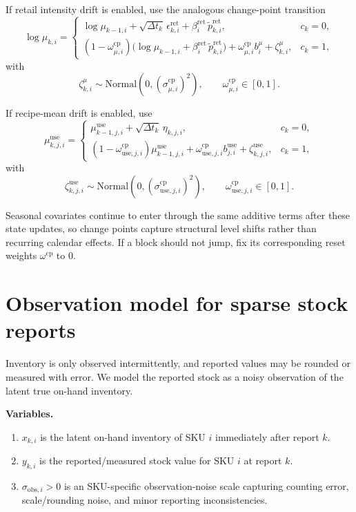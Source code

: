 \documentclass[11pt]{article}
\begin{document}
If retail intensity drift is enabled, use the analogous change-point transition
\begin{equation}\label{eq:cp-retail}
  \log \mu_{k,i}=
  \begin{cases}
    \log \mu_{k-1,i} + \sqrt{\Delta t_k}\,\epsilon^{\mathrm{ret}}_{k,i} + \beta^{\mathrm{ret}}_i\,\tilde p^{\mathrm{ret}}_{k,i}, & c_k=0,\\
    (1-\omega^{\mathrm{cp}}_{\mu,i})\bigl(\log \mu_{k-1,i} + \beta^{\mathrm{ret}}_i\,\tilde p^{\mathrm{ret}}_{k,i}\bigr) + \omega^{\mathrm{cp}}_{\mu,i} b^{\mu}_i + \zeta^{\mu}_{k,i}, & c_k=1,
  \end{cases}
\end{equation}
with
\[
  \zeta^{\mu}_{k,i}\sim\text{Normal}(0,(\sigma^{\mathrm{cp}}_{\mu,i})^2),\qquad \omega^{\mathrm{cp}}_{\mu,i}\in[0,1].
\]

If recipe-mean drift is enabled, use
\begin{equation}\label{eq:cp-recipe}
  \mu^{\mathrm{use}}_{k,j,i}=
  \begin{cases}
    \mu^{\mathrm{use}}_{k-1,j,i}+\sqrt{\Delta t_k}\,\eta_{k,j,i}, & c_k=0,\\
    (1-\omega^{\mathrm{cp}}_{\mathrm{use},j,i})\mu^{\mathrm{use}}_{k-1,j,i} + \omega^{\mathrm{cp}}_{\mathrm{use},j,i} b^{\mathrm{use}}_{j,i} + \zeta^{\mathrm{use}}_{k,j,i}, & c_k=1,
  \end{cases}
\end{equation}
with
\[
  \zeta^{\mathrm{use}}_{k,j,i}\sim\text{Normal}(0,(\sigma^{\mathrm{cp}}_{\mathrm{use},j,i})^2),\qquad \omega^{\mathrm{cp}}_{\mathrm{use},j,i}\in[0,1].
\]

Seasonal covariates continue to enter through the same additive terms after these state updates, so change points capture structural level shifts rather than recurring calendar effects.
If a block should not jump, fix its corresponding reset weights $\omega^{\mathrm{cp}}$ to $0$.

\section{Observation model for sparse stock reports}

Inventory is only observed intermittently, and reported values may be rounded or measured with error.
We model the reported stock as a noisy observation of the latent true on-hand inventory.

\textbf{Variables.}
\begin{enumerate}
  \item $x_{k,i}$ is the latent on-hand inventory of SKU $i$ immediately after report $k$.
  \item $y_{k,i}$ is the reported/measured stock value for SKU $i$ at report $k$.
  \item $\sigma_{\text{obs},i}>0$ is an SKU-specific observation-noise scale capturing counting error, scale/rounding noise, and minor reporting inconsistencies.
\end{enumerate}
\end{document}

